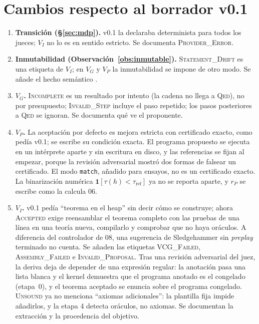 \documentclass[11pt,a4paper]{article}
\theoremstyle{definition}
\theoremstyle{remark}
\newcommand{\lab}[1]{\textsc{#1}}
\newcommand{\id}[1]{\texttt{\detokenize{#1}}}
\begin{document}
\section{Cambios respecto al borrador v0.1}\label{app:cambios}

\begin{enumerate}
  \item \textbf{Transición (§\ref{sec:mdp}).} v0.1 la declaraba determinista para todos los jueces; $V_I$ no lo es en sentido estricto. Se documenta \lab{Provider\_Error}.
  \item \textbf{Inmutabilidad (Observación~\ref{obs:inmutable}).} \lab{Statement\_Drift} es una etiqueta de $V_I$; en $V_G$ y $V_P$ la inmutabilidad se impone de otro modo. Se añade el hecho semántico \id{while_inv_var B I V P = iterate B P}.
  \item \textbf{$V_G$.} \lab{Incomplete} es un resultado por intento (la cadena no llega a \lab{Qed}), no por presupuesto; \lab{Invalid\_Step} incluye el paso repetido; los pasos posteriores a \lab{Qed} se ignoran. Se documenta qué ve el proponente.
  \item \textbf{$V_P$.} La aceptación por defecto es mejora estricta con certificado exacto, como pedía v0.1; se escribe su condición exacta. El programa propuesto se ejecuta en un intérprete aparte y sin escritura en disco, y las referencias se fijan al empezar, porque la revisión adversarial mostró dos formas de falsear un certificado. El modo \texttt{match}, añadido para ensayos, no es un certificado exacto. La binarización numérica $\mathbf{1}[\tau(h) < \tau_{\mathrm{ref}}]$ ya no se reporta aparte, y $r_P$ se escribe como la calcula 06.
  \item \textbf{$V_I$.} v0.1 pedía ``teorema en el heap'' sin decir cómo se construye; ahora \lab{Accepted} exige reensamblar el teorema completo con las pruebas de una línea en una teoría nueva, compilarlo y comprobar que no haya oráculos. A diferencia del controlador de 08, una sugerencia de Sledgehammer sin \emph{preplay} terminado no cuenta. Se añaden las etiquetas \lab{VCG\_Failed}, \lab{Assembly\_Failed} e \lab{Invalid\_Proposal}. Tras una revisión adversarial del juez, la deriva deja de depender de una expresión regular: la anotación pasa una lista blanca y el kernel demuestra que el programa anotado es el congelado (etapa~0), y el teorema aceptado se enuncia sobre el programa congelado. \PostHocApC \lab{Unsound} ya no menciona ``axiomas adicionales'': la plantilla fija impide añadirlos, y la etapa 4 detecta oráculos, no axiomas. Se documentan la extracción y la procedencia del objetivo.

\end{enumerate}
\end{document}
